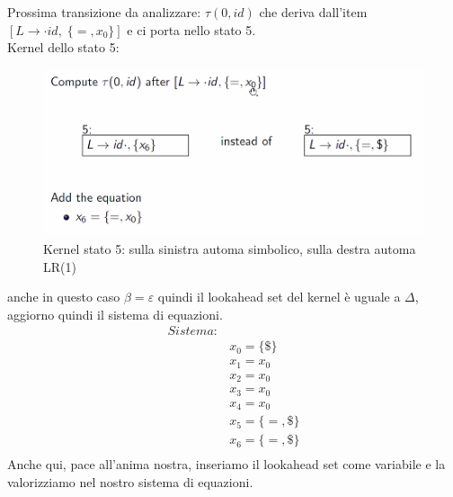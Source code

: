 \documentclass[class=book, crop=false, oneside, 12pt]{standalone}
\begin{document}
Prossima transizione da analizzare: \(\tau(0,id)\) che deriva dall'item \([L \to \cdot id, \; \{=, x_0\}]\) e ci porta nello stato 5.
\\
Kernel dello stato 5:
\begin{figure}
    \centering
    \includegraphics[width=.7\textwidth]{ex_automa_simbolico-kernel_s5.png}
    \caption{Kernel stato 5: sulla sinistra automa simbolico, sulla destra automa LR(1)}
\end{figure}
anche in questo caso  \(\beta = \varepsilon\) quindi il lookahead set del kernel è uguale a \(\Delta\), aggiorno quindi il sistema di equazioni.
\begin{align*}
    Sistema:& \\
            & x_0 = \{\$\} \\
            & x_1 = x_0 \\
            & x_2 = x_0 \\
            & x_3 = x_0 \\
            & x_4 = x_0 \\
            & x_5 = \{=, \$\} \\
            & x_6 = \{=, \$\} \\
\end{align*}
Anche qui, pace all'anima nostra, inseriamo il lookahead set come variabile e la valorizziamo nel nostro sistema di equazioni.
\end{document}
